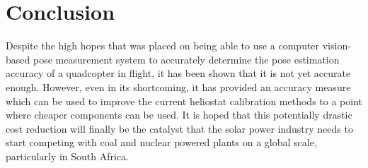 \section{Conclusion}

Despite the high hopes that was placed on being able to use a computer vision-based pose measurement system to accurately determine the pose estimation accuracy of a quadcopter in flight, it has been shown that it is not yet accurate enough. However, even in its shortcoming, it has provided an accuracy measure which can be used to improve the current heliostat calibration methods to a point where cheaper components can be used. It is hoped that this potentially drastic cost reduction will finally be the catalyst that the solar power industry needs to start competing with coal and nuclear powered plants on a global scale, particularly in South Africa. 
